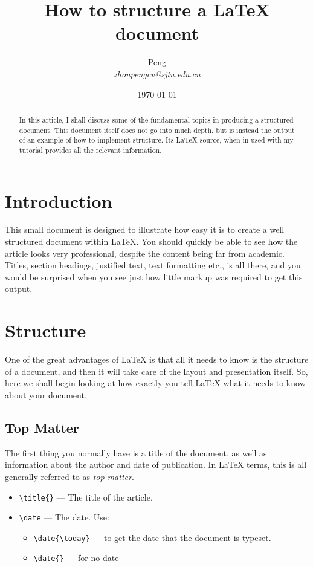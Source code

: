 \documentclass{article}
\begin{document}
\title{How to structure a \LaTeX{} document}
\author{Peng\\
\emph{zhoupengcv@sjtu.edu.cn}}
\date{\today}
\maketitle{}
\begin{abstract}
   In this article, I shall discuss some of the fundamental topics in
 producing a structured document.  This document itself does not go into
 much depth, but is instead the output of an example of how to implement
 structure. Its \LaTeX{} source, when in used with my tutorial
 provides all the relevant information.
\end{abstract}

\section{Introduction}
\label{sec:introduction}

This small document is designed to illustrate how easy it is to create a well structured
document within \LaTeX\cite{lamport94}.  You should quickly be able to see how the article
looks very professional, despite the content being far from academic.  Titles, section
headings, justified text, text formatting etc., is all there, and you would be surprised
when you see just how little markup was required to get this output.

\section{Structure}
\label{sec:structure}

One of the great advantages of \LaTeX{} is that all it needs to know is
the structure of a document, and then it will take care of the layout
and presentation itself.  So, here we shall begin looking at how exactly
you tell \LaTeX{} what it needs to know about your document.

\subsection{Top Matter}
\label{sec:top-matter}

The first thing you normally have is a title of the document, as well as
information about the author and date of publication.  In \LaTeX{} terms,
this is all generally referred to as \emph{top matter}.
\begin{itemize}
\item \verb|\title{}| --- The title of the article.
\item \verb|\date| --- The date. Use:
  \begin{itemize}
  \item \verb|\date{\today}| --- to get the date that the document is typeset.
  \item \verb|\date{}| --- for no date
  \end{itemize}
\end{itemize}
\end{document}
